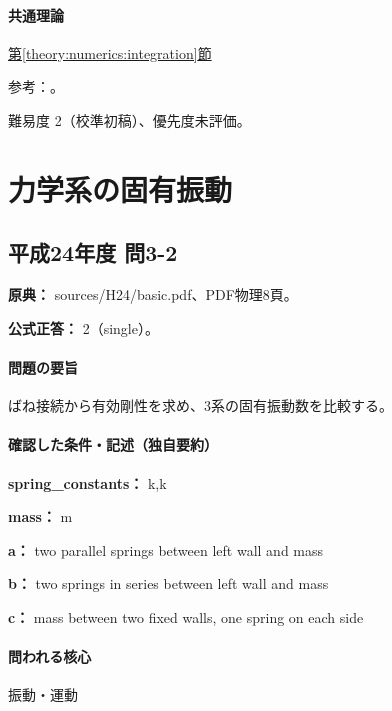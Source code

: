 \paragraph{共通理論} \hyperref[theory:numerics:integration]{第\ref*{theory:numerics:integration}節}

\par 参考：\cite{nist_quadrature}。

\par 難易度 2（校準初稿）、優先度未評価。

\section{力学系の固有振動}

\subsection{平成24年度 問3-2}
\label{q:h24-reg-basic-3-2}

\noindent\textbf{原典：} sources/H24/basic.pdf、PDF物理8頁。

\textbf{公式正答：} 2（single）。

\paragraph{問題の要旨} ばね接続から有効剛性を求め、3系の固有振動数を比較する。

\paragraph{確認した条件・記述（独自要約）}\mbox{}\par

\noindent\textbf{spring\_constants：} k,k\par

\noindent\textbf{mass：} m\par

\noindent\textbf{a：} two parallel springs between left wall and mass\par

\noindent\textbf{b：} two springs in series between left wall and mass\par

\noindent\textbf{c：} mass between two fixed walls, one spring on each side\par

\paragraph{問われる核心} 振動・運動


